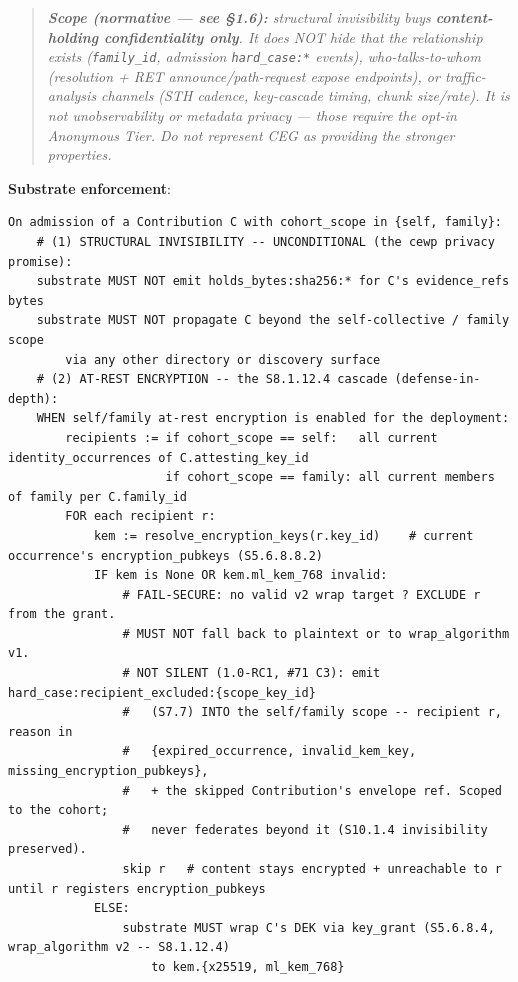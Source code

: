 \documentclass[11pt]{article}
\begin{document}
\begin{quote}\itshape \textbf{Scope (normative — see §1.6):} structural invisibility buys \textbf{content-holding confidentiality only}. It does NOT hide that the relationship exists (\texttt{family\_id}, admission \texttt{hard\_case:*} events), who-talks-to-whom (resolution + RET announce/path-request expose endpoints), or traffic-analysis channels (STH cadence, key-cascade timing, chunk size/rate). It is not unobservability or metadata privacy — those require the opt-in Anonymous Tier. Do not represent CEG as providing the stronger properties.\end{quote}


\textbf{Substrate enforcement}:


\begin{lstlisting}
On admission of a Contribution C with cohort_scope in {self, family}:
    # (1) STRUCTURAL INVISIBILITY -- UNCONDITIONAL (the cewp privacy promise):
    substrate MUST NOT emit holds_bytes:sha256:* for C's evidence_refs bytes
    substrate MUST NOT propagate C beyond the self-collective / family scope
        via any other directory or discovery surface
    # (2) AT-REST ENCRYPTION -- the S8.1.12.4 cascade (defense-in-depth):
    WHEN self/family at-rest encryption is enabled for the deployment:
        recipients := if cohort_scope == self:   all current identity_occurrences of C.attesting_key_id
                      if cohort_scope == family: all current members of family per C.family_id
        FOR each recipient r:
            kem := resolve_encryption_keys(r.key_id)    # current occurrence's encryption_pubkeys (S5.6.8.8.2)
            IF kem is None OR kem.ml_kem_768 invalid:
                # FAIL-SECURE: no valid v2 wrap target ? EXCLUDE r from the grant.
                # MUST NOT fall back to plaintext or to wrap_algorithm v1.
                # NOT SILENT (1.0-RC1, #71 C3): emit hard_case:recipient_excluded:{scope_key_id}
                #   (S7.7) INTO the self/family scope -- recipient r, reason in
                #   {expired_occurrence, invalid_kem_key, missing_encryption_pubkeys},
                #   + the skipped Contribution's envelope ref. Scoped to the cohort;
                #   never federates beyond it (S10.1.4 invisibility preserved).
                skip r   # content stays encrypted + unreachable to r until r registers encryption_pubkeys
            ELSE:
                substrate MUST wrap C's DEK via key_grant (S5.6.8.4, wrap_algorithm v2 -- S8.1.12.4)
                    to kem.{x25519, ml_kem_768}
\end{lstlisting}
\end{document}
